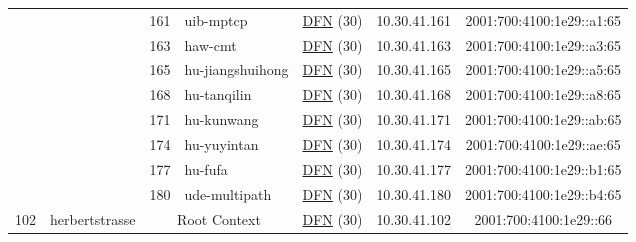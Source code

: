 \begin{small}
\begin{center}
\begin{longtable}{|c|c|c|c|c|c|c|c|}
  &  & \tiny{161} & \multicolumn{1}{|l|}{\tiny{uib-mptcp}} & \multicolumn{2}{|c|}{\tiny{\href{https://www.dfn.de}{DFN} (30)}} & \tiny{10.30.41.161} & \tiny{2001:700:4100:1e29::a1:65} \\* \cline{3-3}\cline{4-4}\cline{5-5}\cline{6-6}\cline{7-7}\cline{8-8}
  &  & \tiny{163} & \multicolumn{1}{|l|}{\tiny{haw-cmt}} & \multicolumn{2}{|c|}{\tiny{\href{https://www.dfn.de}{DFN} (30)}} & \tiny{10.30.41.163} & \tiny{2001:700:4100:1e29::a3:65} \\* \cline{3-3}\cline{4-4}\cline{5-5}\cline{6-6}\cline{7-7}\cline{8-8}
  &  & \tiny{165} & \multicolumn{1}{|l|}{\tiny{hu-jiangshuihong}} & \multicolumn{2}{|c|}{\tiny{\href{https://www.dfn.de}{DFN} (30)}} & \tiny{10.30.41.165} & \tiny{2001:700:4100:1e29::a5:65} \\* \cline{3-3}\cline{4-4}\cline{5-5}\cline{6-6}\cline{7-7}\cline{8-8}
  &  & \tiny{168} & \multicolumn{1}{|l|}{\tiny{hu-tanqilin}} & \multicolumn{2}{|c|}{\tiny{\href{https://www.dfn.de}{DFN} (30)}} & \tiny{10.30.41.168} & \tiny{2001:700:4100:1e29::a8:65} \\* \cline{3-3}\cline{4-4}\cline{5-5}\cline{6-6}\cline{7-7}\cline{8-8}
  &  & \tiny{171} & \multicolumn{1}{|l|}{\tiny{hu-kunwang}} & \multicolumn{2}{|c|}{\tiny{\href{https://www.dfn.de}{DFN} (30)}} & \tiny{10.30.41.171} & \tiny{2001:700:4100:1e29::ab:65} \\* \cline{3-3}\cline{4-4}\cline{5-5}\cline{6-6}\cline{7-7}\cline{8-8}
  &  & \tiny{174} & \multicolumn{1}{|l|}{\tiny{hu-yuyintan}} & \multicolumn{2}{|c|}{\tiny{\href{https://www.dfn.de}{DFN} (30)}} & \tiny{10.30.41.174} & \tiny{2001:700:4100:1e29::ae:65} \\* \cline{3-3}\cline{4-4}\cline{5-5}\cline{6-6}\cline{7-7}\cline{8-8}
  &  & \tiny{177} & \multicolumn{1}{|l|}{\tiny{hu-fufa}} & \multicolumn{2}{|c|}{\tiny{\href{https://www.dfn.de}{DFN} (30)}} & \tiny{10.30.41.177} & \tiny{2001:700:4100:1e29::b1:65} \\* \cline{3-3}\cline{4-4}\cline{5-5}\cline{6-6}\cline{7-7}\cline{8-8}
  &  & \tiny{180} & \multicolumn{1}{|l|}{\tiny{ude-multipath}} & \multicolumn{2}{|c|}{\tiny{\href{https://www.dfn.de}{DFN} (30)}} & \tiny{10.30.41.180} & \tiny{2001:700:4100:1e29::b4:65} \\ \hline
 \multirow{15}{*}{\tiny{102}} & \multicolumn{1}{|l|}{\multirow{15}{*}{\tiny{herbertstrasse}}} & \multicolumn{2}{|c|}{\tiny{Root Context}} & \multicolumn{2}{|c|}{\tiny{\href{https://www.dfn.de}{DFN} (30)}} & \tiny{10.30.41.102} & \tiny{2001:700:4100:1e29::66} \\* \cline{3-3}\cline{4-4}\cline{5-5}\cline{6-6}\cline{7-7}\cline{8-8}

\end{longtable}
\end{center}
\end{small}
